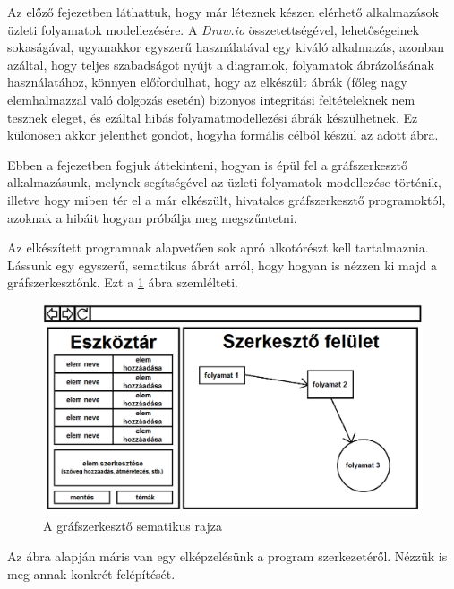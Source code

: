 

Az előző fejezetben láthattuk, hogy már léteznek készen elérhető alkalmazások üzleti folyamatok modellezésére. A \textit{Draw.io} összetettségével, lehetőségeinek sokaságával, ugyanakkor egyszerű használatával egy kiváló alkalmazás, azonban azáltal, hogy teljes szabadságot nyújt a diagramok, folyamatok ábrázolásának használatához, könnyen előfordulhat, hogy az elkészült ábrák (főleg nagy elemhalmazzal való dolgozás esetén) bizonyos integritási feltételeknek nem tesznek eleget, és ezáltal hibás folyamatmodellezési ábrák készülhetnek. Ez különösen akkor jelenthet gondot, hogyha formális célból készül az adott ábra.

Ebben a fejezetben fogjuk áttekinteni, hogyan is épül fel a gráfszerkesztő alkalmazásunk, melynek segítségével az üzleti folyamatok modellezése történik, illetve hogy miben tér el a már elkészült, hivatalos gráfszerkesztő programoktól, azoknak a hibáit hogyan próbálja meg megszűntetni.


Az elkészített programnak alapvetően sok apró alkotórészt kell tartalmaznia. Lássunk egy egyszerű, sematikus ábrát arról, hogy hogyan is nézzen ki majd a gráfszerkesztőnk. Ezt a \ref{fig:sematikus} ábra szemlélteti.

\begin{figure}[h]
\centering
\includegraphics[scale=0.5]{images/sematikus.png}
\caption{A gráfszerkesztő sematikus rajza}
\label{fig:sematikus}
\end{figure}

Az ábra alapján máris van egy elképzelésünk a program szerkezetéről. Nézzük is meg annak konkrét felépítését.

